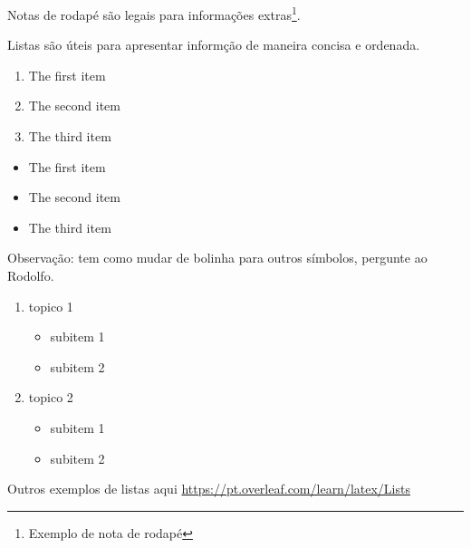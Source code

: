         Notas de rodapé são legais para informações extras\footnote{Exemplo de nota de rodapé}.



        Listas são úteis para apresentar informção de maneira concisa e ordenada.


            \begin{enumerate}
                \item The first item
                \item The second item
                \item The third item
            \end{enumerate}


            \begin{itemize}
                \item The first item
                \item The second item
                \item The third item
            \end{itemize}

Observação: tem como mudar de bolinha para outros símbolos, pergunte ao Rodolfo.


\begin{enumerate}
   \item topico 1
     \begin{itemize}
         \item subitem 1
         \item subitem 2
      \end{itemize}
   \item topico 2
       \begin{itemize}
         \item subitem 1
         \item subitem 2
       \end{itemize}
\end{enumerate}


Outros exemplos de listas aqui \url{https://pt.overleaf.com/learn/latex/Lists}

